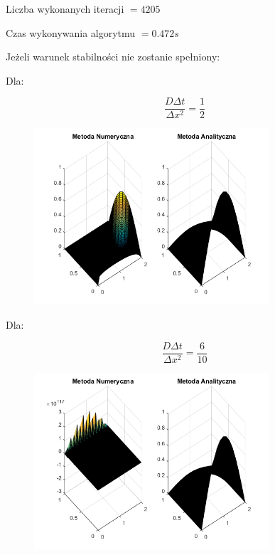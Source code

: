 Liczba wykonanych iteracji $ = 4205 $

Czas wykonywania algorytmu $ = 0.472 s$

\newpage

Jeżeli warunek stabilności nie zostanie spełniony:

Dla:

$$\dfrac{D\Delta t}{\Delta x^2} = \dfrac{1}{2}$$

\begin{figure}[!ht]
	\begin{center}
		\includegraphics[width=0.78\textwidth]{Lab7/charts/ftcs/oscylowanko05.png}
	\end{center}
\end{figure}

Dla:

$$\dfrac{D\Delta t}{\Delta x^2} = \dfrac{6}{10}$$

\begin{figure}[!ht]
	\begin{center}
		\includegraphics[width=0.78\textwidth]{Lab7/charts/ftcs/oscylowanko06.png}
	\end{center}
\end{figure}

